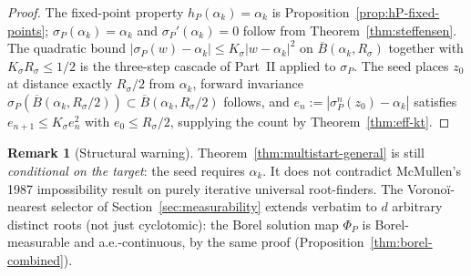 \documentclass[11pt,a4paper]{article}
\theoremstyle{definition}
\newtheorem{remark}{Remark}[section]
\begin{document}
\begin{proof}
The fixed-point property $h_P(\alpha_k) = \alpha_k$ is Proposition~\ref{prop:hP-fixed-points}; $\sigma_P(\alpha_k) = \alpha_k$ and $\sigma_P'(\alpha_k) = 0$ follow from Theorem~\ref{thm:steffensen}. The quadratic bound $|\sigma_P(w) - \alpha_k| \leq K_\sigma|w - \alpha_k|^2$ on $\overline{B}(\alpha_k, R_\sigma)$ together with $K_\sigma R_\sigma \leq 1/2$ is the three-step cascade of Part~II applied to $\sigma_P$. The seed places $z_0$ at distance exactly $R_\sigma/2$ from $\alpha_k$, forward invariance $\sigma_P(\overline{B}(\alpha_k, R_\sigma/2)) \subset \overline{B}(\alpha_k, R_\sigma/2)$ follows, and $e_n := |\sigma_P^n(z_0) - \alpha_k|$ satisfies $e_{n+1} \leq K_\sigma e_n^2$ with $e_0 \leq R_\sigma/2$, supplying the count by Theorem~\ref{thm:eff-kt}.
\end{proof}

\begin{remark}[Structural warning]
Theorem~\ref{thm:multistart-general} is still \emph{conditional on the target}: the seed requires $\alpha_k$. It does not contradict McMullen's 1987 impossibility result on purely iterative universal root-finders. The Voronoï-nearest selector of Section~\ref{sec:measurability} extends verbatim to $d$ arbitrary distinct roots (not just cyclotomic): the Borel solution map $\Phi_P$ is Borel-measurable and a.e.-continuous, by the same proof (Proposition~\ref{thm:borel-combined}).
\end{remark}
\end{document}
